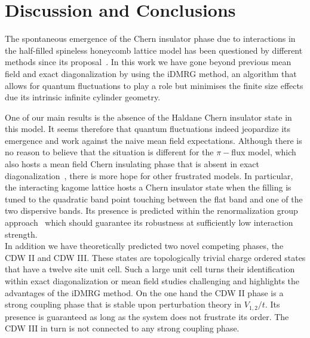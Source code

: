 \documentclass[aps,prx,10pt,twocolumn,floatfix,superscriptaddress,showpacs,numerical,footinbib]{revtex4-1}
\begin{document}
\section{\label{sec:discconc}Discussion and Conclusions}
%

The spontaneous emergence of the Chern insulator phase due to interactions in the half-filled spineless honeycomb lattice
model has been questioned by different methods since its proposal~\cite{RQHZ08,WF10,GCC13,GGNVC13,DH14,DCH14}.
%
In this work we have gone beyond previous mean field and exact diagonalization by using the iDMRG method, an algorithm that allows for quantum fluctuations
to play a role but minimises the finite size effects due its intrinsic infinite cylinder geometry.

One of our main results is the absence of the Haldane Chern insulator state in this model.
%
It seems therefore that quantum fluctuations indeed jeopardize its emergence and work against
the naive mean field expectations.
%
Although there is no reason to believe that the situation is different for the $\pi-$flux model, which also hosts a
mean field Chern insulating phase that is absent in exact diagonalization~\cite{WF10,JGC13}, 
there is more hope for other frustrated models.
%
In particular, the interacting kagome lattice hosts a Chern insulator state when the filling is tuned to
the quadratic band point touching between the flat band and one of the two dispersive bands.
%
Its presence is predicted within the renormalization group approach~\cite{SF08,SYF09} which should guarantee
its robustness at sufficiently low interaction strength.\\
%
In addition we have theoretically predicted two novel competing phases, the CDW II and CDW III.
%
These states are topologically trivial charge ordered states that have a twelve site unit cell.
%
Such a large unit cell turns their identification within exact diagonalization or mean field studies 
challenging and highlights the advantages of the iDMRG method.
%
On the one hand the CDW II phase is a strong coupling phase that is stable upon perturbation theory in $V_{1,2}/t$.
%
Its presence is guaranteed as long as the system does not frustrate its order. 
%
The CDW III in turn is not connected to any strong coupling phase.
\end{document}
